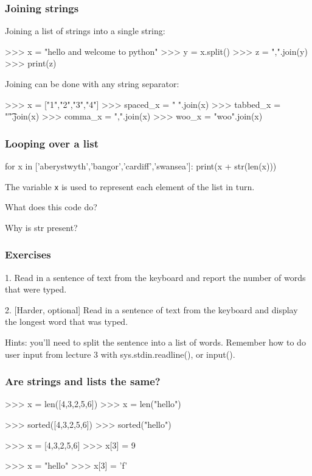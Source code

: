 \documentclass{beamer}
\begin{document}
\begin{frame}[fragile]
\frametitle{Joining strings}
Joining a list of strings into a single string:
\begin{code}
>>> x = "hello and welcome to python"
>>> y = x.split()
>>> z = ",".join(y)
>>> print(z)
\end{code}

Joining can be done with any string separator:
\begin{code}
>>> x = ["1","2","3","4"]
>>> spaced_x = " ".join(x)
>>> tabbed_x = "\t".join(x)
>>> comma_x  = ",".join(x)
>>> woo_x    = "woo".join(x)
\end{code}
\end{frame}

\begin{frame}[fragile]
\frametitle{Looping over a list}
\begin{code}
for x in ['aberystwyth','bangor','cardiff','swansea']:
   print(x + str(len(x)))
\end{code}

The variable \texttt{x} is used to represent each element of the list
in turn.

What does this code do?

Why is str present?
\end{frame}

\begin{frame}[fragile]
\frametitle{Exercises}
1. Read in a sentence of text from the keyboard and report the number of
words that were typed.

\bigskip

2. [Harder, optional] Read in a sentence of text from the keyboard and display the longest word
that was typed.

\bigskip 

Hints: you'll need to split the sentence into a list of words. Remember
how to do user input from lecture 3 with sys.stdin.readline(), or input().
\end{frame}


\begin{frame}[fragile]
\frametitle{Are strings and lists the same?}
\begin{code}
>>> x = len([4,3,2,5,6])
>>> x = len("hello")

>>> sorted([4,3,2,5,6])
>>> sorted("hello")

>>> x = [4,3,2,5,6]
>>> x[3] = 9

>>> x = "hello"
>>> x[3] = 'f'
\end{code}

\end{frame}
\end{document}
